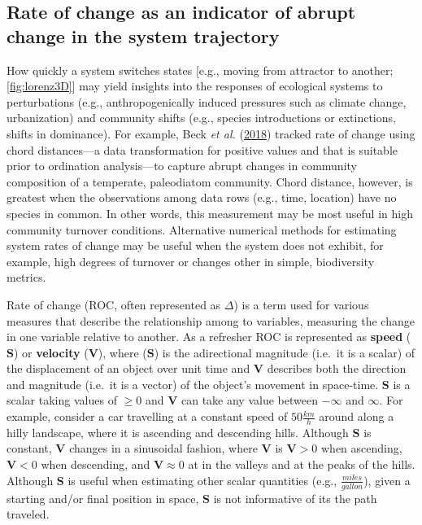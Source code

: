 \documentclass[12pt,twoside,openany]{reedthesis}
\begin{document}
\hypertarget{rate-of-change-as-an-indicator-of-abrupt-change-in-the-system-trajectory}{%
\subsection{Rate of change as an indicator of abrupt change in the system trajectory}\label{rate-of-change-as-an-indicator-of-abrupt-change-in-the-system-trajectory}}

How quickly a system switches states {[}e.g., moving from attractor to another; \ref{fig:lorenz3D}{]} may yield insights into the responses of ecological systems to perturbations (e.g., anthropogenically induced pressures such as climate change, urbanization) and community shifts (e.g., species introductions or extinctions, shifts in dominance). For example, Beck \emph{et al.} (\protect\hyperlink{ref-beck_variance_2018}{2018}) tracked rate of change using chord distances---a data transformation for positive values and that is suitable prior to ordination analysis---to capture abrupt changes in community composition of a temperate, paleodiatom community. Chord distance, however, is greatest when the observations among data rows (e.g., time, location) have no species in common. In other words, this measurement may be most useful in high community turnover conditions. Alternative numerical methods for estimating system rates of change may be useful when the system does not exhibit, for example, high degrees of turnover or changes other in simple, biodiversity metrics.

Rate of change (ROC, often represented as \(\Delta\)) is a term used for various measures that describe the relationship among to variables, measuring the change in one variable relative to another. As a refresher ROC is represented as \textbf{speed} (\(\textbf{S}\)) or \textbf{velocity} (\(\textbf{V}\)), where (\(\textbf{S}\)) is the adirectional magnitude (i.e.~it is a scalar) of the displacement of an object over unit time and \(\textbf{V}\) describes both the direction and magnitude (i.e.~it is a vector) of the object's movement in space-time. \(\textbf{S}\) is a scalar taking values of \(\geq0\) and \(\textbf{V}\) can take any value between \(-\infty\) and \(\infty\). For example, consider a car travelling at a constant speed of \(50\frac{km}{h}\) around along a hilly landscape, where it is ascending and descending hills. Although \(\textbf{S}\) is constant, \(\textbf{V}\) changes in a sinusoidal fashion, where \(\textbf{V}\) is \(\textbf{V}>0\) when ascending, \(\textbf{V}<0\) when descending, and \(\textbf{V}\approx0\) at in the valleys and at the peaks of the hills. Although \(\textbf{S}\) is useful when estimating other scalar quantities (e.g., \(\frac{miles}{gallon}\)), given a starting and/or final position in space, \(\textbf{S}\) is not informative of its the path traveled.
\end{document}
